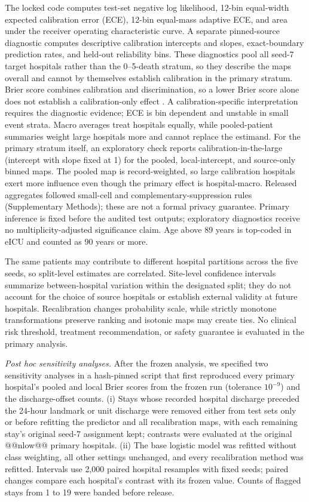 \documentclass[11pt]{article}
\begin{document}
The locked code computes test-set negative log likelihood, 12-bin equal-width expected calibration error (ECE), 12-bin equal-mass adaptive ECE, and area under the receiver operating characteristic curve. A separate pinned-source diagnostic computes descriptive calibration intercepts and slopes, exact-boundary prediction rates, and held-out reliability bins. These diagnostics pool all seed-7 target hospitals rather than the 0--5-death stratum, so they describe the maps overall and cannot by themselves establish calibration in the primary stratum. Brier score combines calibration and discrimination, so a lower Brier score alone does not establish a calibration-only effect \cite{r3}. A calibration-specific interpretation requires the diagnostic evidence; ECE is bin dependent and unstable in small event strata. Macro averages treat hospitals equally, while pooled-patient summaries weight large hospitals more and cannot replace the estimand. For the primary stratum itself, an exploratory check reports calibration-in-the-large (intercept with slope fixed at 1)\cite{vancalster2016} for the pooled, local-intercept, and source-only binned maps. The pooled map is record-weighted, so large calibration hospitals exert more influence even though the primary effect is hospital-macro. Released aggregates followed small-cell and complementary-suppression rules (Supplementary Methods); these are not a formal privacy guarantee. Primary inference is fixed before the audited test outputs; exploratory diagnostics receive no multiplicity-adjusted significance claim. Age above 89 years is top-coded in eICU and counted as 90 years or more.

The same patients may contribute to different hospital partitions across the five seeds, so split-level estimates are correlated. Site-level confidence intervals summarize between-hospital variation within the designated split; they do not account for the choice of source hospitals or establish external validity at future hospitals. Recalibration changes probability scale, while strictly monotone transformations preserve ranking and isotonic maps may create ties. No clinical risk threshold, treatment recommendation, or safety guarantee is evaluated in the primary analysis.

\textit{Post hoc sensitivity analyses.} After the frozen analysis, we specified two sensitivity analyses in a hash-pinned script that first reproduced every primary hospital's pooled and local Brier scores from the frozen run (tolerance $10^{-9}$) and the discharge-offset counts. (i) Stays whose recorded hospital discharge preceded the 24-hour landmark or unit discharge were removed either from test sets only or before refitting the predictor and all recalibration maps, with each remaining stay's original seed-7 assignment kept; contrasts were evaluated at the original @@nlow@@ primary hospitals. (ii) The base logistic model was refitted without class weighting, all other settings unchanged, and every recalibration method was refitted. Intervals use 2,000 paired hospital resamples with fixed seeds; paired changes compare each hospital's contrast with its frozen value. Counts of flagged stays from 1 to 19 were banded before release.
\end{document}
